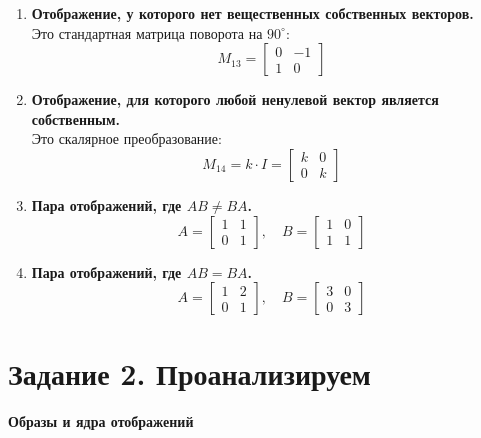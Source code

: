 \begin{enumerate}
  \item \textbf{Отображение, у которого нет вещественных собственных векторов.}\\
  Это стандартная матрица поворота на $90^\circ$:
  \[
    M_{13} = \begin{bmatrix}
      0 & -1 \\
      1 & 0
    \end{bmatrix}
  \]

  \item \textbf{Отображение, для которого любой ненулевой вектор является собственным.}\\
  Это скалярное преобразование:
  \[
    M_{14} = k \cdot I =
    \begin{bmatrix}
      k & 0 \\
      0 & k
    \end{bmatrix}
  \]

  \item \textbf{Пара отображений, где $AB \neq BA$.}\\
  \[
    A = \begin{bmatrix}
      1 & 1 \\
      0 & 1
    \end{bmatrix}, \quad
    B = \begin{bmatrix}
      1 & 0 \\
      1 & 1
    \end{bmatrix}
  \]

  \item \textbf{Пара отображений, где $AB = BA$.}\\
  \[
    A = \begin{bmatrix}
      1 & 2 \\
      0 & 1
    \end{bmatrix}, \quad
    B = \begin{bmatrix}
      3 & 0 \\
      0 & 3
    \end{bmatrix}
  \]
\end{enumerate}

\section*{Задание 2. Проанализируем}

\textbf{Образы и ядра отображений}

